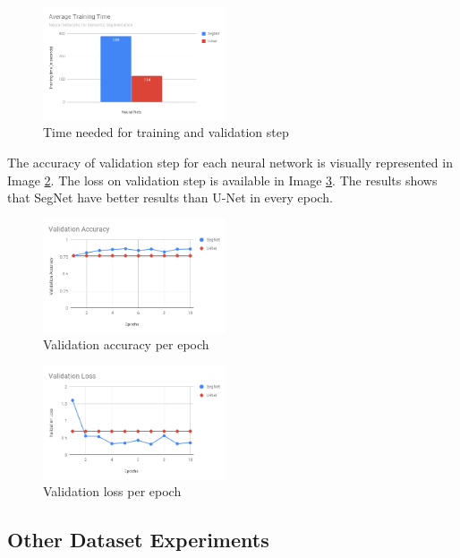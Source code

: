 \documentclass[10pt,twocolumn,letterpaper]{article}
\begin{document}
\begin{figure}[ht]
  \centering
  \includegraphics[width=0.48\textwidth]{graph_training_time.png}
  \caption{Time needed for training and validation step}
  \label{fig:training_time}
\end{figure}

The accuracy of validation step for each neural network is visually represented in Image \ref{fig:val_acc}. The loss on validation step is available in Image \ref{fig:val_loss}. The results shows that SegNet have better results than U-Net in every epoch.

\begin{figure}[ht]
  \centering
  \includegraphics[width=0.48\textwidth]{graph_val_acc.png}
  \caption{Validation accuracy per epoch}
  \label{fig:val_acc}
\end{figure}

\begin{figure}[ht]
  \centering
  \includegraphics[width=0.48\textwidth]{graph_val_loss.png}
  \caption{Validation loss per epoch}
  \label{fig:val_loss}
\end{figure}

\subsection{Other Dataset Experiments} \label{ssec:other_experiments}
\end{document}
